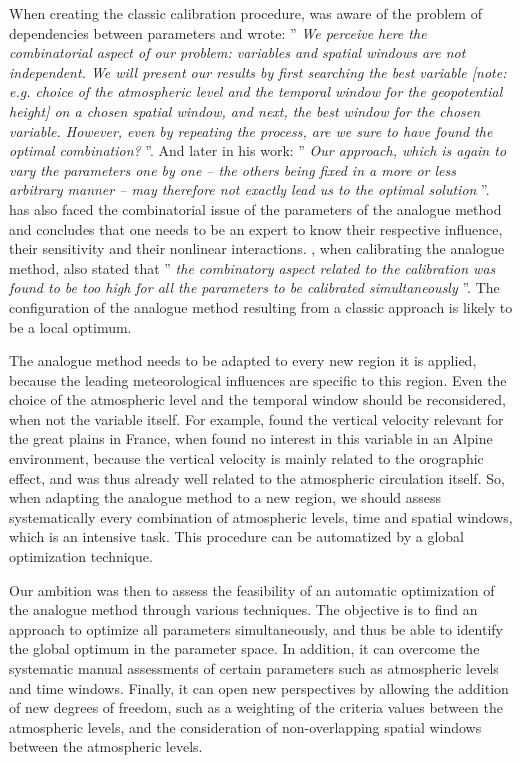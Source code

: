 \documentclass[twocol]{ametsoc}
\begin{document}
When creating the classic calibration procedure, \citet{Bontron2004} was aware of the problem of dependencies between parameters and wrote: '' \textit{We perceive here the combinatorial aspect of our problem: variables and spatial windows are not independent. We will present our results by first searching the best variable [note: e.g. choice of the atmospheric level and the temporal window for the geopotential height] on a chosen spatial window, and next, the best window for the chosen variable. However, even by repeating the process, are we sure to have found the optimal combination?} ''. And later in his work: '' \textit{Our approach, which is again to vary the parameters one by one -- the others being fixed in a more or less arbitrary manner -- may therefore not exactly lead us to the optimal solution} ''. \citet{Bliefernicht2010} has also faced the combinatorial issue of the parameters of the analogue method and concludes that one needs to be an expert to know their respective influence, their sensitivity and their nonlinear interactions. \citet{BenDaoud2010}, when calibrating the analogue method, also stated that '' \textit{the combinatory aspect related to the calibration was found to be too high for all the parameters to be calibrated simultaneously } ''. The configuration of the analogue method resulting from a classic approach is likely to be a local optimum.

The analogue method needs to be adapted to every new region it is applied, because the leading meteorological influences are specific to this region. Even the choice of the atmospheric level and the temporal window should be reconsidered, when not the variable itself. For example, \citet{BenDaoud2010} found the vertical velocity relevant for the great plains in France, when \citet{Horton2012a} found no interest in this variable in an Alpine environment, because the vertical velocity is mainly related to the orographic effect, and was thus already well related to the atmospheric circulation itself. So, when adapting the analogue method to a new region, we should assess systematically every combination of atmospheric levels, time and spatial windows, which is an intensive task. This procedure can be automatized by a global optimization technique.

Our ambition was then to assess the feasibility of an automatic optimization of the analogue method through various techniques. The objective is to find an approach to optimize all parameters simultaneously, and thus be able to identify the global optimum in the parameter space. In addition, it can overcome the systematic manual assessments of certain parameters such as atmospheric levels and time windows. Finally, it can open new perspectives by allowing the addition of new degrees of freedom, such as a weighting of the criteria values between the atmospheric levels, and the consideration of non-overlapping spatial windows between the atmospheric levels.
\end{document}
